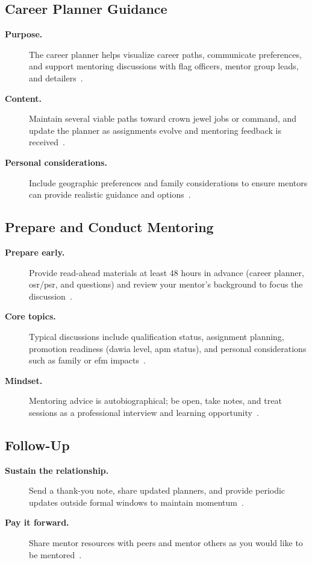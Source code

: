 \documentclass[../main.tex]{subfiles}
\begin{document}
\subsection{Career Planner Guidance}
\begin{description}
  \item[\textbf{Purpose.}] The career planner helps visualize career paths, communicate preferences, and
  support mentoring discussions with flag officers, mentor group leads, and detailers~\autocite{edo-5-2-6-mentoring-tips-2025}.
  \item[\textbf{Content.}] Maintain several viable paths toward crown jewel jobs or command, and update the
  planner as assignments evolve and mentoring feedback is received~\autocite{edo-5-2-6-mentoring-tips-2025}.
  \item[\textbf{Personal considerations.}] Include geographic preferences and family considerations to ensure
  mentors can provide realistic guidance and options~\autocite{edo-5-2-6-mentoring-tips-2025}.
\end{description}

\subsection{Prepare and Conduct Mentoring}
\begin{description}
  \item[\textbf{Prepare early.}] Provide read-ahead materials at least 48 hours in advance (career planner,
  \ac{osr}/\ac{psr}, and questions) and review your mentor's background to focus the discussion~\autocite{edo-5-2-6-mentoring-tips-2025}.
  \item[\textbf{Core topics.}] Typical discussions include qualification status, assignment planning,
  promotion readiness (\ac{dawia} level, \ac{apm} status), and personal considerations such as family or
  \ac{efm} impacts~\autocite{edo-5-2-6-mentoring-tips-2025}.
  \item[\textbf{Mindset.}] Mentoring advice is autobiographical; be open, take notes, and treat sessions as a
  professional interview and learning opportunity~\autocite{edo-5-2-6-mentoring-tips-2025}.
\end{description}

\subsection{Follow-Up}
\begin{description}
  \item[\textbf{Sustain the relationship.}] Send a thank-you note, share updated planners, and provide
  periodic updates outside formal windows to maintain momentum~\autocite{edo-5-2-6-mentoring-tips-2025}.
  \item[\textbf{Pay it forward.}] Share mentor resources with peers and mentor others as you would like to be
  mentored~\autocite{edo-5-2-6-mentoring-tips-2025}.
\end{description}
\end{document}
